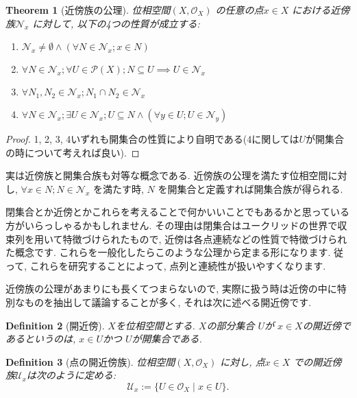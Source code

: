 \documentclass[lualatex]{ltjsbook}
\newtheorem{theorem}{Theorem}[chapter]
\newtheorem{definition}[theorem]{Definition}
\theoremstyle{remark}
\theoremstyle{plain}
\begin{document}
\begin{theorem}[近傍族の公理]
	位相空間$\left( X , \mathcal{O}_X \right) $ の任意の点$x\in X$ における近傍族$\mathcal{N}_x$ に対して,  以下の4つの性質が成立する:
	\begin{enumerate}
		\item $\mathcal{N}_x \neq \emptyset \land \left( \forall N \in \mathcal{N}_x ; x \in N \right)$
		\item $\forall N \in \mathcal{N}_x; \forall U \in \mathcal{P}\left( X \right) ; N\subseteq U \implies U \in \mathcal{N}_x$
		\item $\forall N_1,  N_2 \in \mathcal{N}_x ; N_1 \cap N_2 \in \mathcal{N}_x$
		\item $\forall N \in \mathcal{N}_x; \exists U \in \mathcal{N}_x ;U\subseteq N\land \left( \forall y \in U; U \in \mathcal{N}_y  \right)  $
	\end{enumerate}
\end{theorem}

\begin{proof}
	1, 2, 3, 4いずれも開集合の性質により自明である(4に関しては$U$が開集合の時について考えれば良い).
\end{proof}

実は近傍族と開集合族も対等な概念である. 近傍族の公理を満たす位相空間に対し,  $\forall x \in N; N \in \mathcal{N}_x$ を満たす時,  $N$ を開集合と定義すれば開集合族が得られる. 

閉集合とか近傍とかこれらを考えることで何かいいことでもあるかと思っている方がいらっしゃるかもしれません.
その理由は閉集合はユークリッドの世界で収束列を用いて特徴づけられたもので,  近傍は各点連続などの性質で特徴づけられた概念です.
これらを一般化したらこのような公理から定まる形になります. 従って,  これらを研究することによって,  点列と連続性が扱いやすくなります.

近傍族の公理があまりにも長くてつまらないので,  実際に扱う時は近傍の中に特別なものを抽出して議論することが多く,  それは次に述べる開近傍です.





\begin{definition}[開近傍]
	$X$を位相空間とする. $X$の部分集合 $U$が $x \in X$の開近傍であるというのは,   $ x \in U$かつ $U$が開集合である.
\end{definition}

\begin{definition}[点の開近傍族]
	位相空間$\left( X,  \mathcal{O}_X \right) $ に対し,  点$x \in X$ での開近傍族$\mathcal{U}_x$は次のように定める:
	\[
	\mathcal{U}_x := \{U \in \mathcal{O}_X \mid x \in U\} 
	.\] 
\end{definition}
\end{document}
